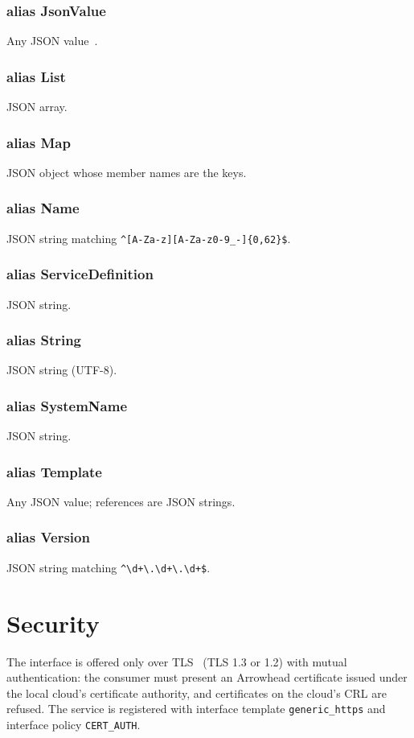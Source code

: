 \documentclass[a4paper]{arrowhead}
\newcommand{\pdef}[1]{{\textcolor{ArrowheadGrey}{#1\label{sec:model:primitives:#1}\label{sec:model:primitives:#1s}}}}
\begin{document}
\subsubsection*{alias \pdef{JsonValue}}
Any JSON value~\cite{rfc8259}.

\subsubsection*{alias \pdef{List}}
JSON array.

\subsubsection*{alias \pdef{Map}}
JSON object whose member names are the keys.

\subsubsection*{alias \pdef{Name}}
JSON string matching \texttt{\^{}[A-Za-z][A-Za-z0-9\_-]\{0,62\}\$}.

\subsubsection*{alias \pdef{ServiceDefinition}}
JSON string.

\subsubsection*{alias \pdef{String}}
JSON string (UTF-8).

\subsubsection*{alias \pdef{SystemName}}
JSON string.

\subsubsection*{alias \pdef{Template}}
Any JSON value; references are JSON strings.

\subsubsection*{alias \pdef{Version}}
JSON string matching \texttt{\^{}\textbackslash{}d+\textbackslash{}.\textbackslash{}d+\textbackslash{}.\textbackslash{}d+\$}.



\section{Security}
\label{sec:security}
The interface is offered only over TLS~\cite{rfc8446} (TLS 1.3 or 1.2) with mutual authentication: the consumer must
present an Arrowhead certificate issued under the local cloud's certificate authority, and certificates on the
cloud's CRL are refused. The service is registered with interface template \texttt{generic\_https} and interface
policy \texttt{CERT\_AUTH}.
\end{document}
